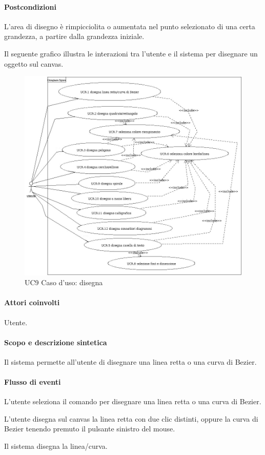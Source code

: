 \paragraph{Postcondizioni} L'area di disegno \`e rimpicciolita o aumentata nel punto selezionato di una certa grandezza, a partire dalla grandezza iniziale.
\newpage

\label{ucdisegna}
Il seguente grafico illustra le interazioni tra l'utente e il sistema per disegnare un oggetto sul canvas.

\begin{figure}[!ht]
\centering
\vspace{20pt} 
\includegraphics[width=17cm]{UC9Espanso.jpg}
\caption{UC9 Caso d'uso: disegna}
\label{uc9}
\end{figure}


\paragraph{Attori coinvolti} Utente.
\paragraph{Scopo e descrizione sintetica} 
Il sistema permette all'utente di disegnare una linea retta o una curva di Bezier.
\paragraph{Flusso di eventi}
\begin{elenconumerato}[\textbf{}]{\subsubsecindent}
\item L'utente seleziona il comando per disegnare una linea retta o una curva di Bezier.
\item L'utente disegna sul canvas la linea retta con due clic distinti, oppure la curva di Bezier tenendo premuto il pulsante sinistro del mouse.
\item Il sistema disegna la linea/curva.
\end{elenconumerato}
